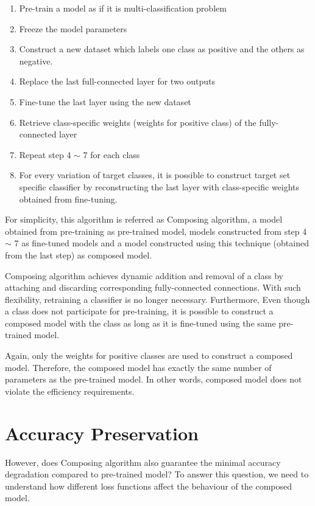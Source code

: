 \documentclass{article}
\begin{document}
\begin{enumerate}
    \item Pre-train a model as if it is multi-classification problem
    \item Freeze the model parameters
    \item Construct a new dataset which labels one class as positive and the others as negative.
    \item Replace the last full-connected layer for two outputs
    \item Fine-tune the last layer using the new dataset
    \item Retrieve class-specific weights (weights for positive class) of the fully-connected layer
    \item Repeat step 4 $\sim$ 7 for each class
    \item For every variation of target classes, it is possible to construct target set specific classifier by reconstructing the last layer with class-specific weights obtained from fine-tuning.
\end{enumerate}

For simplicity, this algorithm is referred as Composing algorithm, a model obtained from pre-training as pre-trained model, models constructed from step 4 $\sim$ 7 as fine-tuned models and a model constructed using this technique (obtained from the last step) as composed model.

Composing algorithm achieves dynamic addition and removal of a class by attaching and discarding corresponding fully-connected connections. With such flexibility, retraining a classifier is no longer necessary. Furthermore, Even though a class does not participate for pre-training, it is possible to construct a composed model with the class as long as it is fine-tuned using the same pre-trained model.

Again, only the weights for positive classes are used to construct a composed model. Therefore, the composed model has exactly the same number of parameters as the pre-trained model. In other words, composed model does not violate the efficiency requirements.

\section{Accuracy Preservation}

However, does Composing algorithm also guarantee the minimal accuracy degradation compared to pre-trained model? To answer this question, we need to understand how different loss functions affect the behaviour of the composed model.
\end{document}
